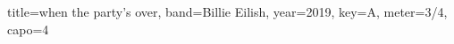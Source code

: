 \documentclass{bekki-leadsheet}
\begin{document}
\begin{song}[transpose-capo=true]{title={when the party's over}, band={Billie Eilish}, year={2019}, key={A}, meter={3/4}, capo={4}}



\end{song}
\end{document}
